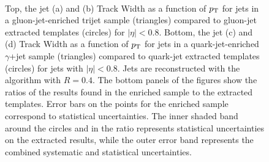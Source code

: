 \begin{figure}[p]
\begin{center}
 \\
\caption{Top, the jet (a) \ntrk and (b) Track Width as a function of $p_{\text{T}}$ for jets in a
gluon-jet-enriched trijet sample (triangles) compared to gluon-jet extracted templates (circles) for
$|\eta|<0.8$. Bottom, the jet (c) \ntrk and (d) Track Width as a function of $p_{\text{T}}$ for jets in a quark-jet-enriched $\gamma$+jet
sample (triangles) compared to quark-jet extracted templates (circles) for jets with $|\eta|<0.8$.
Jets are reconstructed with the \antikt algorithm with $R=0.4$. The bottom
panels of the figures show the ratios of the results found in the enriched sample to the extracted templates. Error bars on
the points for the enriched sample correspond to statistical uncertainties. The inner
shaded band around the circles and in the ratio represents statistical uncertainties on the
extracted results, while the outer error band represents the combined systematic and statistical
uncertainties.
}
\label{fig:jet-reconstruction:qg:pure_trijet_ntrkTrkWidth}
\end{center}
\end{figure}

